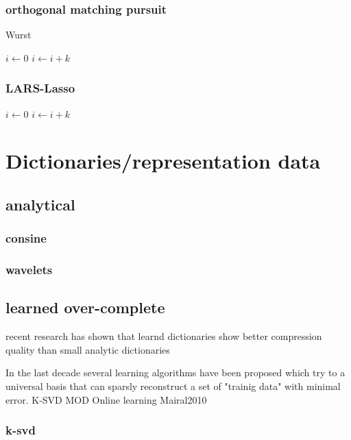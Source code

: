 \subsubsection{orthogonal matching pursuit}
\label{sec:omp}
\begin{algorithm}
\caption{Wurst}
\begin{algorithmic}
        \STATE $i\gets 0$
\ELSE
                \STATE $i\gets i+k$
        \ENDIF
\ENDIF 
\end{algorithmic}

\subsubsection{LARS-Lasso}
\begin{algorithmic}
        \STATE $i\gets 0$
\ELSE
                \STATE $i\gets i+k$
        \ENDIF
\ENDIF 
\end{algorithmic}
\end{algorithm}

\section{Dictionaries/representation data}
\subsection{analytical}
\subsubsection{consine}
\subsubsection{wavelets}

\subsection{learned over-complete}
recent research has shown that learnd dictionaries show better compression quality than small analytic dictionaries \cite{Aharon2006KSVD} \cite{Chen1998Atomic} 


In the last decade several learning algorithms have been proposed which try to a universal basis that 
can sparsly reconstruct a set of "trainig data" with minimal error. 
K-SVD
MOD
Online learning
Mairal2010

\subsubsection{k-svd}
